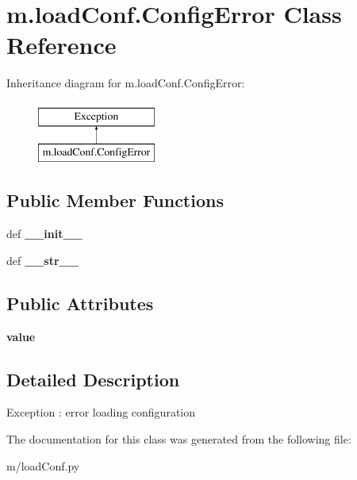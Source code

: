 \hypertarget{classm_1_1load_conf_1_1_config_error}{\section{m.\-load\-Conf.\-Config\-Error Class Reference}
\label{classm_1_1load_conf_1_1_config_error}
}
Inheritance diagram for m.\-load\-Conf.\-Config\-Error\-:\begin{figure}[H]
\begin{center}
\leavevmode
\includegraphics[height=2.000000cm]{classm_1_1load_conf_1_1_config_error}
\end{center}
\end{figure}
\subsection*{Public Member Functions}
\begin{DoxyCompactItemize}
\item 
\hypertarget{classm_1_1load_conf_1_1_config_error_a33facc9fac19952f7b5a88f7c8e32649}{def {\bfseries \-\_\-\-\_\-init\-\_\-\-\_\-}}\label{classm_1_1load_conf_1_1_config_error_a33facc9fac19952f7b5a88f7c8e32649}

\item 
\hypertarget{classm_1_1load_conf_1_1_config_error_a2da563460e4a813f567a8ff8e810036d}{def {\bfseries \-\_\-\-\_\-str\-\_\-\-\_\-}}\label{classm_1_1load_conf_1_1_config_error_a2da563460e4a813f567a8ff8e810036d}

\end{DoxyCompactItemize}
\subsection*{Public Attributes}
\begin{DoxyCompactItemize}
\item 
\hypertarget{classm_1_1load_conf_1_1_config_error_af6b99671bc89ab2fd2195aa8711c9380}{{\bfseries value}}\label{classm_1_1load_conf_1_1_config_error_af6b99671bc89ab2fd2195aa8711c9380}

\end{DoxyCompactItemize}


\subsection{Detailed Description}
\begin{DoxyVerb}Exception : error loading configuration\end{DoxyVerb}
 

The documentation for this class was generated from the following file\-:\begin{DoxyCompactItemize}
\item 
m/load\-Conf.\-py\end{DoxyCompactItemize}
